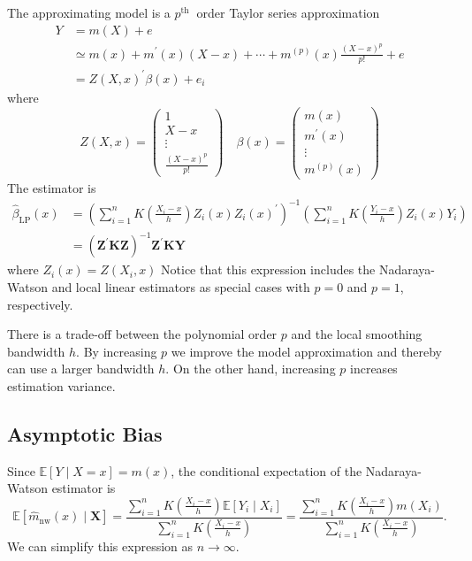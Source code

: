 \documentclass[10pt]{article}
\begin{document}
The approximating model is a $p^{\text {th }}$ order Taylor series approximation
$$
\begin{aligned}
Y &=m(X)+e \\
& \simeq m(x)+m^{\prime}(x)(X-x)+\cdots+m^{(p)}(x) \frac{(X-x)^{p}}{p !}+e \\
&=Z(X, x)^{\prime} \beta(x)+e_{i}
\end{aligned}
$$
where
$$
Z(X, x)=\left(\begin{array}{c}
1 \\
X-x \\
\vdots \\
\frac{(X-x)^{p}}{p !}
\end{array}\right) \quad \beta(x)=\left(\begin{array}{c}
m(x) \\
m^{\prime}(x) \\
\vdots \\
m^{(p)}(x)
\end{array}\right)
$$
The estimator is
$$
\begin{aligned}
\widehat{\beta}_{\mathrm{LP}}(x) &=\left(\sum_{i=1}^{n} K\left(\frac{X_{i}-x}{h}\right) Z_{i}(x) Z_{i}(x)^{\prime}\right)^{-1}\left(\sum_{i=1}^{n} K\left(\frac{Y_{i}-x}{h}\right) Z_{i}(x) Y_{i}\right) \\
&=\left(\boldsymbol{Z}^{\prime} \boldsymbol{K} \boldsymbol{Z}\right)^{-1} \boldsymbol{Z}^{\prime} \boldsymbol{K} \boldsymbol{Y}
\end{aligned}
$$
where $Z_{i}(x)=Z\left(X_{i}, x\right)$ Notice that this expression includes the Nadaraya-Watson and local linear estimators as special cases with $p=0$ and $p=1$, respectively.

There is a trade-off between the polynomial order $p$ and the local smoothing bandwidth $h$. By increasing $p$ we improve the model approximation and thereby can use a larger bandwidth $h$. On the other hand, increasing $p$ increases estimation variance.

\subsection{Asymptotic Bias}
Since $\mathbb{E}[Y \mid X=x]=m(x)$, the conditional expectation of the Nadaraya-Watson estimator is
$$
\mathbb{E}\left[\widehat{m}_{\mathrm{nw}}(x) \mid \boldsymbol{X}\right]=\frac{\sum_{i=1}^{n} K\left(\frac{X_{i}-x}{h}\right) \mathbb{E}\left[Y_{i} \mid X_{i}\right]}{\sum_{i=1}^{n} K\left(\frac{X_{i}-x}{h}\right)}=\frac{\sum_{i=1}^{n} K\left(\frac{X_{i}-x}{h}\right) m\left(X_{i}\right)}{\sum_{i=1}^{n} K\left(\frac{X_{i}-x}{h}\right)} .
$$
We can simplify this expression as $n \rightarrow \infty$.
\end{document}
